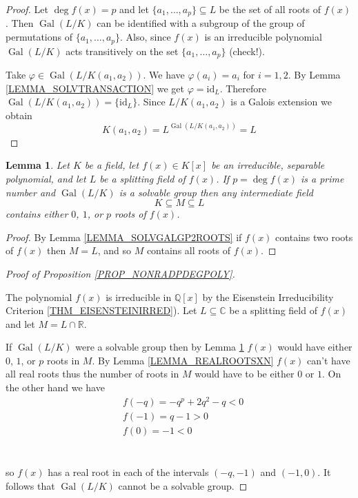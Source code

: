 \documentclass[12pt, letterpaper, oneside]{article}
\theoremstyle{plain}
\newtheorem{lemma}[theorem]{Lemma}
\theoremstyle{definition}
\newcommand{\Q}{{\mathbb Q}}
\newcommand{\R}{{\mathbb R}}
\newcommand{\C}{{\mathbb C}}
\newcommand{\id}{\mathrm{id}}
\newcommand{\Gal}{\operatorname{Gal}}
\newcommand{\vs}{\vskip 5mm}
\begin{document}
\vs

\begin{proof}
Let $\deg f(x) = p$ and let $\{a_{1}, \dots, a_{p}\}\subseteq L$ be the set of all roots of 
$f(x)$. Then $\Gal(L/K)$ can be identified with  a subgroup of the group of permutations
of   $\{a_{1}, \dots, a_{p}\}$. Also, since $f(x)$ is an irreducible polynomial $\Gal(L/K)$ 
acts transitively on the set $\{a_{1}, \dots, a_{p}\}$ (check!). 

Take $\varphi\in \Gal(L/K(a_{1}, a_{2}))$. We have $\varphi(a_{i}) =a_{i}$ for $i=1, 2$. By 
Lemma \ref{LEMMA_SOLVTRANSACTION}  we get $\varphi = \id_{L}$. Therefore 
$\Gal(L/K(a_{1}, a_{2})) = \{\id_{L}\}$. Since $L/K(a_{1}, a_{2})$ is a Galois extension
we obtain 
$$K(a_{1}, a_{2}) = L^{\Gal(L/K(a_{1}, a_{2}))} = L$$

\end{proof}

\vs\vs


\begin{lemma}
\label{LEMMA_01PROOTS}
Let $K$ be a field,  let $f(x)\in K[x]$ be an irreducible, separable polynomial, and 
let $L$ be a splitting field of $f(x)$. If $p = \deg f(x)$ is a prime number and $\Gal(L/K)$
is a solvable group then any intermediate field 
$$K\subseteq M \subseteq L$$
contains either $0$, $1$, or $p$ roots of $f(x)$. 
\end{lemma}

\vs 

\begin{proof}
By Lemma \ref{LEMMA_SOLVGALGP2ROOTS} if $f(x)$ contains  two roots 
of $f(x)$ then $M= L$, and so $M$ contains all roots of $f(x)$. 
\end{proof}

\vs\vs

\begin{proof}[Proof of Proposition \ref{PROP_NONRADPDEGPOLY}] \ 

The polynomial $f(x)$ is irreducible in $\Q[x]$ by  the Eisenstein Irreducibility Criterion 
\ref{THM_EISENSTEINIRRED}). Let $L\subseteq \C$ be a splitting field of $f(x)$
and let $M = L \cap \R$. 

If  $\Gal(L/K)$ were a solvable group then by Lemma \ref{LEMMA_01PROOTS}
$f(x)$ would have either $0$, $1$, or $p$ roots in $M$. 
By Lemma \ref{LEMMA_REALROOTSXN} $f(x)$ can't have all real roots thus 
the number of roots in $M$ would have to be either $0$ or $1$. On the other 
hand we have 
\begin{align*}
& f(-q)  = -q^{p}+2q^{2}-q  < 0 \\  
& f(-1)  = q-1 > 0 \\ 
& f(0)  = -1 < 0 \\ 
\end{align*} 
\ 

\vskip -13mm

so $f(x)$ has a real root in each of the intervals $(-q, -1)$ and $(-1, 0)$. It follows that 
$\Gal(L/K)$ cannot be a solvable group. 
\end{proof}
\end{document}
